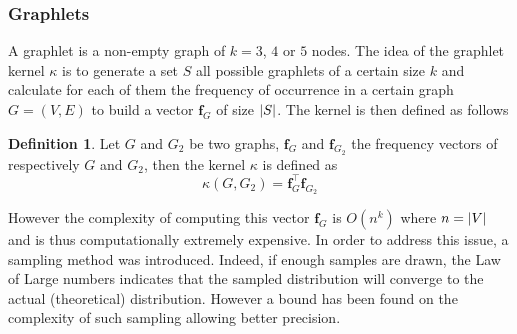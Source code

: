 \documentclass{article}
\DeclarePairedDelimiter{\abs}{\lvert}{\rvert}
\let\vec\mathbf
\theoremstyle{definition}
\newtheorem{definition}{Definition}
\begin{document}
\subsubsection{Graphlets}
A graphlet is a non-empty graph of $k=3$, $4$ or $5$ nodes. The idea of the graphlet kernel $\kappa$ is to generate a set $S$ all possible graphlets of a certain size $k$ and calculate for each of them the frequency of occurrence in a certain graph $G=(V,E)$ to build a vector $\vec{f}_G$ of size $\abs{S}$. The kernel is then defined as follows
\begin{definition}
	Let $G$ and $G_2$ be two graphs, $\vec{f}_G$ and $\vec{f}_{G_2}$ the frequency vectors of respectively $G$ and $G_2$, then the kernel $\kappa$ is defined as
	\begin{equation}
		\kappa(G,G_{2})=\vec{f}_{G}^{\top}\vec{f}_{G_2}
	\end{equation}
\end{definition}
However the complexity of computing this vector $\vec{f}_G$ is $O(n^k)$ where $n=\abs{V}$ and is thus computationally extremely expensive. In order to address this issue, a sampling method was introduced. Indeed, if enough samples are drawn, the Law of Large numbers indicates that the sampled distribution will converge to the actual (theoretical) distribution. However a bound has been found on the complexity of such sampling\cite{weissman2003inequalities} allowing better precision.
\end{document}
